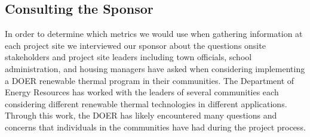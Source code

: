     \subsection{Consulting the Sponsor}
    \par In order to determine which metrics we would use when gathering information at each project site we interviewed our sponsor about the questions onsite stakeholders and project site leaders including town officials, school administration, and housing managers have asked when considering implementing a DOER renewable thermal program in their communities. The Department of Energy Resources has worked with the leaders of several communities each considering different renewable thermal technologies in different applications. Through this work, the DOER has likely encountered many questions and concerns that individuals in the communities have had during the project process.

